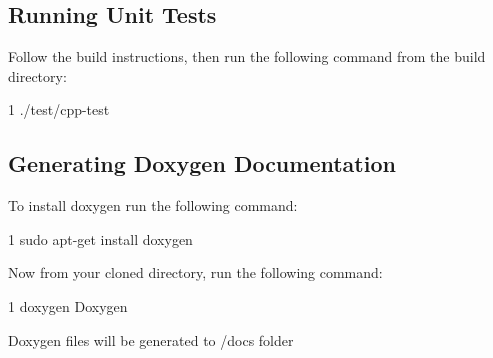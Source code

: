 \subsection*{Running Unit Tests}

Follow the build instructions, then run the following command from the build directory\+: 
\begin{DoxyCode}
1 ./test/cpp-test
\end{DoxyCode}


\subsection*{Generating Doxygen Documentation}

To install doxygen run the following command\+: 
\begin{DoxyCode}
1 sudo apt-get install doxygen
\end{DoxyCode}


Now from your cloned directory, run the following command\+:


\begin{DoxyCode}
1 doxygen Doxygen
\end{DoxyCode}


Doxygen files will be generated to /docs folder 
